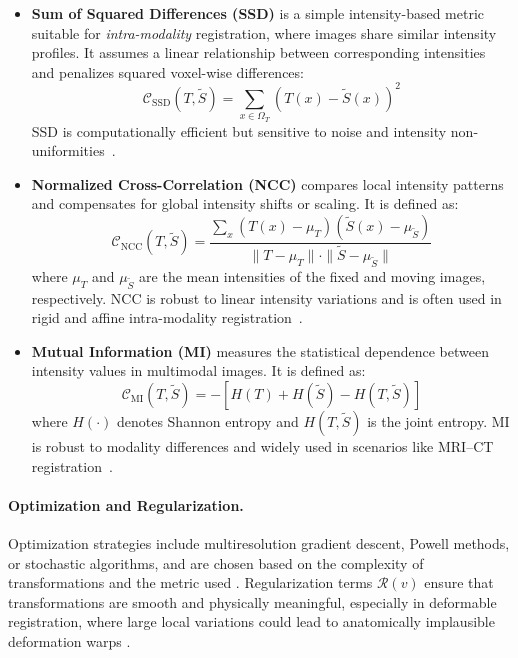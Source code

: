 \begin{itemize}
    \item \textbf{Sum of Squared Differences (SSD)} is a simple intensity-based metric suitable for \textit{intra-modality} registration, where images share similar intensity profiles. It assumes a linear relationship between corresponding intensities and penalizes squared voxel-wise differences:
    \begin{equation}
        \mathcal{C}_{\text{SSD}}(T, \tilde{S}) = \sum_{x \in \Omega_T} \left( T(x) - \tilde{S}(x) \right)^2
        \label{eq:ssd}
    \end{equation}
    SSD is computationally efficient but sensitive to noise and intensity non-uniformities~\cite{Zitova2003-ds,Maintz1998-gs}.

    \item \textbf{Normalized Cross-Correlation (NCC)} compares local intensity patterns and compensates for global intensity shifts or scaling. It is defined as:
    \begin{equation}
        \mathcal{C}_{\text{NCC}}(T, \tilde{S}) = \frac{\sum_x (T(x) - \mu_T)(\tilde{S}(x) - \mu_{\tilde{S}})}{\|T - \mu_T\| \cdot \|\tilde{S} - \mu_{\tilde{S}}\|}
        \label{eq:ncc}
    \end{equation}
    where \( \mu_T \) and \( \mu_{\tilde{S}} \) are the mean intensities of the fixed and moving images, respectively. NCC is robust to linear intensity variations and is often used in rigid and affine intra-modality registration~\cite{Pluim2003-kb}.

    \item \textbf{Mutual Information (MI)} measures the statistical dependence between intensity values in multimodal images. It is defined as:
    \begin{equation}
        \mathcal{C}_{\text{MI}}(T, \tilde{S}) = - \left[ H(T) + H(\tilde{S}) - H(T, \tilde{S}) \right]
        \label{eq:mi}
    \end{equation}
    where \( H(\cdot) \) denotes Shannon entropy and \( H(T, \tilde{S}) \) is the joint entropy. MI is robust to modality differences and widely used in scenarios like MRI--CT registration~\cite{Maes1997-jb,Wells1996-at}.
\end{itemize}

\paragraph{Optimization and Regularization.}
Optimization strategies include multiresolution gradient descent, Powell methods, or stochastic algorithms, and are chosen based on the complexity of transformations and the metric used \cite{Song2017-kq}. Regularization terms \( \mathcal{R}(v) \) ensure that transformations are smooth and physically meaningful, especially in deformable registration, where large local variations could lead to anatomically implausible deformation warps \cite{Castano-Aguirre2024-db}.

